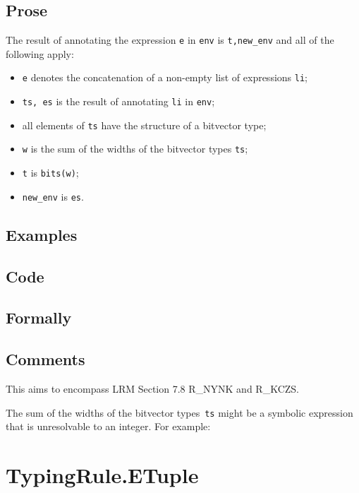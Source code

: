 \documentclass{book}
\begin{document}
  \subsection{Prose}
  The result of annotating the expression \texttt{e} in \texttt{env} is
\texttt{t,new\_env} and all of the following apply:
  \begin{itemize}
  \item \texttt{e} denotes the concatenation of a non-empty list of expressions \texttt{li};
  \item \texttt{ts, es} is the result of annotating \texttt{li} in \texttt{env};
  \item all elements of \texttt{ts} have the structure of a bitvector type;
  \item \texttt{w} is the sum of the widths of the bitvector types \texttt{ts};
  \item \texttt{t} is \texttt{bits(w)};
  \item \texttt{new\_env} is \texttt{es}.
  \end{itemize}

  \subsection{Examples}

  \subsection{Code}

  \subsection{Formally}

  \subsection{Comments}
  This aims to encompass LRM Section 7.8 R\_NYNK and R\_KCZS.

  The sum of the widths of the bitvector types~\texttt{ts} might be a symbolic
expression that is unresolvable to an integer. For example:


\section{TypingRule.ETuple \label{sec:TypingRule.ETuple}}
\end{document}
